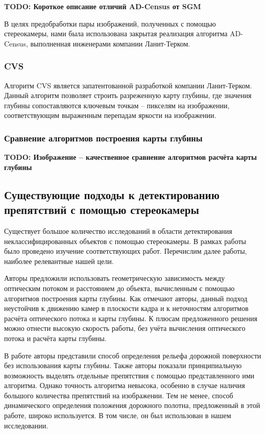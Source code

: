 \documentclass[aps,%
14pt,%
final,%
oneside,
onecolumn,%
musixtex, %
superscriptaddress,%
centertags]{extarticle} %
\begin{document}
\textbf{\Large TODO: Короткое описание отличий AD-Census от SGM}

В целях предобработки пары изображений, полученных с помощью стереокамеры, нами была использована закрытая реализация алгоритма AD-Census, выполненная инженерами компании Ланит-Терком.


\subsubsection{CVS}
Алгоритм CVS является запатентованной разработкой компании Ланит-Терком. Данный алгоритм позволяет строить разреженную карту глубины, где значения глубины сопоставляются ключевым точкам -- пикселям на изображении, соответствующим выраженным перепадам яркости на изображении.

\subsubsection{Сравнение алгоритмов построения карты глубины}

\textbf{\Large TODO: Изображение -- качественное сравнение алгоритмов расчёта карты глубины}


\subsection{Существующие подходы к детектированию препятствий с помощью стереокамеры}

Существует большое количество исследований в области детектирования неклассифицированных объектов с помощью стереокамеры. В рамках работы было проведено изучение соответствующих работ. Перечислим далее работы, наиболее  релевантные нашей цели.

Авторы \cite{heinrich2002fast} предложили использовать геометрическую зависимость между оптическим потоком и расстоянием до объекта, вычисленным с помощью алгоритмов построения карты глубины. Как отмечают авторы, данный подход неустойчив к движению камер в плоскости кадра и к неточностям алгоритмов расчёта оптического потока и карты глубины. К плюсам предложенного решения можно отнести высокую скорость работы, без учёта вычисления оптического потока и расчёта карты глубины.

В работе \cite{labayrade2002real} авторы представили способ определения рельефа дорожной поверхности без использования карты глубины. Также авторы показали принципиальную возможность выделять отдельные препятствия с помощью представленного ими алгоритма. Однако точность алгоритма невысока, особенно в случае наличия большого количества препятствий на изображении. Тем не менее, способ динамического определения положения дорожного полотна, предложенный в этой работе, широко используется. В том числе, он был использован в нашем исследовании.
\end{document}
